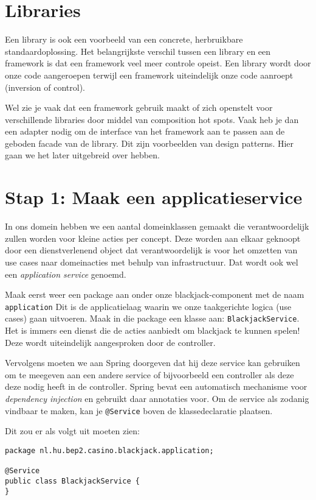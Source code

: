 \section{Libraries}
Een library is ook een voorbeeld van een concrete, herbruikbare standaardoplossing.
Het belangrijkste verschil tussen een library en een framework is dat 
een framework veel meer controle opeist. Een library wordt door onze code aangeroepen
terwijl een framework uiteindelijk onze code aanroept (inversion of control).

Wel zie je vaak dat een framework gebruik maakt of zich openstelt voor verschillende
libraries door middel van composition hot spots. Vaak heb je dan een adapter nodig 
om de interface van het framework aan te passen aan de geboden facade van de library.
Dit zijn voorbeelden van design patterns. Hier gaan we het later uitgebreid over hebben.

\section{Stap 1: Maak een applicatieservice}
In ons domein hebben we een aantal domeinklassen gemaakt die verantwoordelijk 
zullen worden voor kleine acties per concept. Deze worden aan elkaar geknoopt 
door een dienstverlenend object dat verantwoordelijk is voor het omzetten van 
use cases naar domeinacties met behulp van infrastructuur. 
Dat wordt ook wel een \textit{application service} genoemd.

Maak eerst weer een package aan onder onze blackjack-component met de naam \texttt{application}
Dit is de applicatielaag waarin we onze taakgerichte logica (use cases) gaan uitvoeren.
Maak in die package een klasse aan: \texttt{BlackjackService}.
Het is immers een dienst die de acties aanbiedt om blackjack te kunnen spelen!
Deze wordt uiteindelijk aangesproken door de controller.

Vervolgens moeten we aan Spring doorgeven dat hij deze service kan gebruiken 
om te meegeven aan een andere service of bijvoorbeeld een controller als deze 
deze nodig heeft in de controller. Spring bevat een automatisch mechanisme 
voor \textit{dependency injection} en gebruikt daar annotaties voor. Om de service 
als zodanig vindbaar te maken, kan je \texttt{@Service} boven de klassedeclaratie plaatsen.

Dit zou er als volgt uit moeten zien:
\begin{verbatim}
package nl.hu.bep2.casino.blackjack.application;

@Service
public class BlackjackService {
}
\end{verbatim}

